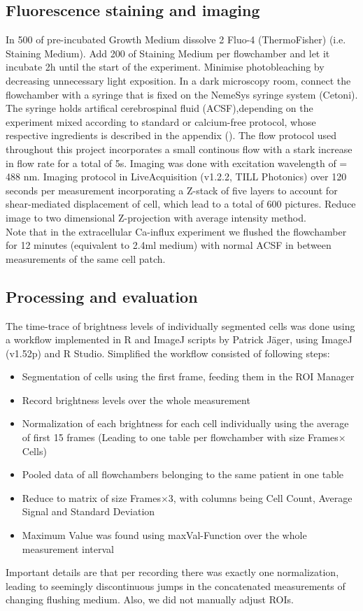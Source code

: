 \subsection{Fluorescence staining and imaging}
In 500\mul{} of pre-incubated Growth Medium dissolve 2\mul{} Fluo-4 (ThermoFisher) (i.e. Staining Medium). Add 200\mul{} of Staining Medium per flowchamber and let it incubate 2h until the start of the experiment. 
Minimise photobleaching by decreasing unnecessary light exposition. In a dark microscopy room, connect the flowchamber with a syringe that is fixed on the NemeSys syringe system (Cetoni). The syringe holds artifical cerebrospinal fluid (ACSF),depending on the experiment mixed according to standard or calcium-free protocol, whose respective ingredients is described in the appendix (). The flow protocol used throughout this project incorporates a small continous flow with a stark increase in flow rate for a total of 5s. Imaging was done with excitation wavelength of \textlambda{} = 488 nm. Imaging protocol in LiveAcquisition (v1.2.2, TILL Photonics) over 120 seconds per measurement incorporating a Z-stack of five layers to account for shear-mediated displacement of cell, which lead to a total of 600 pictures. Reduce image to two dimensional Z-projection with average intensity method.  \\
Note that in the extracellular Ca-influx experiment we flushed the flowchamber for 12 minutes (equivalent to 2.4ml medium) with normal ACSF in between measurements of the same cell patch.


\subsection{Processing and evaluation}

The time-trace of brightness levels of individually segmented cells was done using a workflow implemented in R and ImageJ scripts by Patrick Jäger, using ImageJ (v1.52p) and R Studio. Simplified the workflow consisted of following steps:

\begin{itemize}
	\item Segmentation of cells using the first frame, feeding them in the ROI Manager
	\item Record brightness levels over the whole measurement
	\item Normalization of each brightness for each cell individually using the average of first 15 frames (Leading to one table per flowchamber with size Frames$\times$Cells)
	\item Pooled data of all flowchambers belonging to the same patient in one table
	\item Reduce to matrix of size Frames$\times$3, with columns being Cell Count, Average Signal and Standard Deviation
	\item Maximum Value was found using maxVal-Function over the whole measurement interval
\end{itemize}

Important details are that per recording there was exactly one normalization, leading to seemingly discontinuous jumps in the concatenated measurements of changing flushing medium. Also, we did not manually adjust ROIs. 




